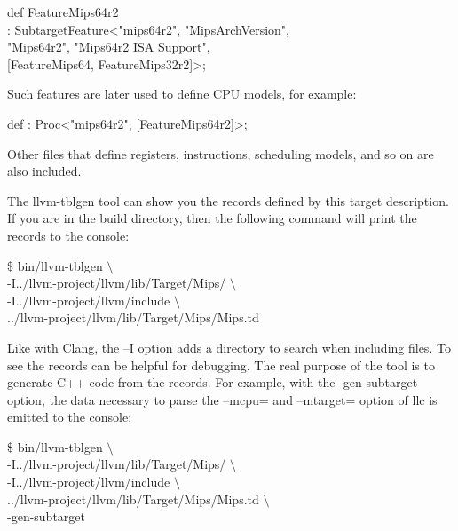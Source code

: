 \begin{tcolorbox}[colback=white,colframe=black]
def FeatureMips64r2 \\
\hspace*{0.5cm}: SubtargetFeature<"mips64r2", "MipsArchVersion",  \\
\hspace*{4cm}"Mips64r2", "Mips64r2 ISA Support", \\
\hspace*{4cm}[FeatureMips64, FeatureMips32r2]>;
\end{tcolorbox}

Such features are later used to define CPU models, for example:\par

\begin{tcolorbox}[colback=white,colframe=black]
def : Proc<"mips64r2", [FeatureMips64r2]>;
\end{tcolorbox}

Other files that define registers, instructions, scheduling models, and so on are also included.\par

The llvm-tblgen tool can show you the records defined by this target description. If you are in the build directory, then the following command will print the records to the console:\par

\begin{tcolorbox}[colback=white,colframe=black]
\$ bin/llvm-tblgen $\setminus$ \\
\hspace*{0.5cm}-I../llvm-project/llvm/lib/Target/Mips/ $\setminus$ \\
\hspace*{0.5cm}-I../llvm-project/llvm/include $\setminus$ \\
\hspace*{0.5cm}../llvm-project/llvm/lib/Target/Mips/Mips.td
\end{tcolorbox}

Like with Clang, the –I option adds a directory to search when including files. To see the records can be helpful for debugging. The real purpose of the tool is to generate C++ code from the records. For example, with the -gen-subtarget option, the data necessary to parse the –mcpu= and –mtarget= option of llc is emitted to the console:\par

\begin{tcolorbox}[colback=white,colframe=black]
\$ bin/llvm-tblgen $\setminus$ \\
\hspace*{0.5cm}-I../llvm-project/llvm/lib/Target/Mips/ $\setminus$ \\
\hspace*{0.5cm}-I../llvm-project/llvm/include $\setminus$ \\
\hspace*{0.5cm}../llvm-project/llvm/lib/Target/Mips/Mips.td $\setminus$ \\
\hspace*{0.5cm}-gen-subtarget
\end{tcolorbox}

